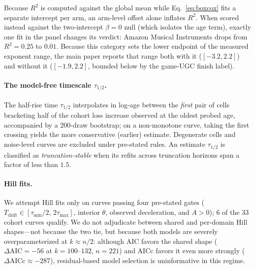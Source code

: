 \documentclass[10pt,letterpaper]{article}
\newcommand{\Tdrift}{T_{\mathrm{drift}}}
\begin{document}
Because $R^2$ is computed against the global mean while Eq.~\eqref{eq:boxcox}
fits a separate intercept per arm, an arm-level offset alone inflates $R^2$. When
scored instead against the two-intercept $\beta = 0$ null (which isolates the
age term), exactly one fit in the panel changes its verdict: Amazon Musical
Instruments drops from $R^2 = 0.25$ to $0.01$. Because this category sets the
lower endpoint of the measured exponent range, the main paper reports that range
both with it ($[-3.2, 2.2]$) and without it ($[-1.9, 2.2]$, bounded below by
the game-UGC finish label).

\paragraph{The model-free timescale $\tau_{1/2}$.}
The half-rise time $\tau_{1/2}$ interpolates in log-age between the \emph{first}
pair of cells bracketing half of the cohort loss increase observed at the
oldest probed age, accompanied by a 200-draw bootstrap; on a non-monotone curve,
taking the first crossing yields the more conservative (earlier) estimate.
Degenerate cells and noise-level curves are excluded under pre-stated rules.
An estimate $\tau_{1/2}$ is classified as \emph{truncation-stable} when its
refits across truncation horizons span a factor of less than $1.5$.

\paragraph{Hill fits.}
We attempt Hill fits only on curves passing four pre-stated gates
($\Tdrift \in [\tau_{\min}/2,\, 2\tau_{\max}]$, interior $\theta$, observed
deceleration, and $A > 0$); 6 of the 33 cohort curves qualify. We do not
adjudicate between shared and per-domain Hill shapes---not because the two tie,
but because both models are severely overparameterized at $k \approx n/2$:
although AIC favors the shared shape ($\Delta\mathrm{AIC} = -56$ at
$k = 100$--$132$, $n = 221$) and $\mathrm{AICc}$ favors it even more strongly
($\Delta\mathrm{AICc} \approx -287$), residual-based model selection is
uninformative in this regime.
\end{document}

